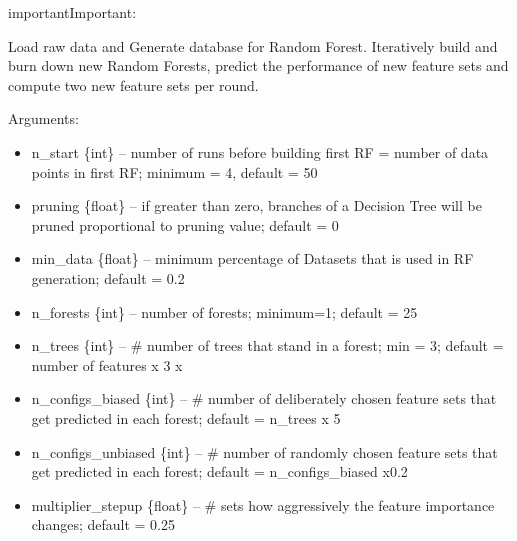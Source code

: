 \documentclass[letterpaper,10pt,english]{sphinxmanual}
\begin{document}
\begin{sphinxadmonition}{important}{Important:}
\begin{fulllineitems}
\begin{description}
\begin{itemize}
\end{itemize}

\end{description}

\end{fulllineitems}



\begin{fulllineitems}
Load raw data and Generate database for Random Forest. Iteratively build and burn down new Random Forests, predict the performance of new feature sets and compute two new feature sets per round.

Arguments:
\begin{itemize}
\item {} 
n\_start \{int\} -- number of runs before building first RF = number of data points in first RF; minimum = 4, default = 50

\item {} 
pruning \{float\} -- if greater than zero, branches of a Decision Tree will be pruned proportional to pruning value; default = 0

\item {} 
min\_data \{float\} -- minimum percentage of Datasets that is used in RF generation; default = 0.2

\item {} 
n\_forests \{int\} -- number of forests; minimum=1;  default = 25

\item {} 
n\_trees \{int\} -- \# number of trees that stand in a forest; min = 3; default = number of features x 3 x

\item {} 
n\_configs\_biased \{int\} -- \# number of deliberately chosen feature sets that get predicted in each forest; default = n\_trees x 5

\item {} 
n\_configs\_unbiased \{int\} -- \# number of randomly chosen feature sets that get predicted in each forest; default = n\_configs\_biased x0.2

\item {} 
multiplier\_stepup \{float\} -- \# sets how aggressively the feature importance changes; default = 0.25


\end{itemize}
\end{fulllineitems}
\end{sphinxadmonition}
\end{document}
